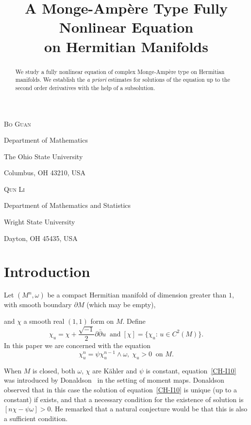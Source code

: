 \documentclass[12pt]{amsart}
\title[Complex Monge-Amp\`ere Type Equation]
{A Monge-Amp\`ere Type Fully Nonlinear Equation \\ on Hermitian Manifolds}
\author[Bo Guan and Qun Li]{}
\theoremstyle{definition}
\numberwithin{equation}{section}
\begin{document}
\maketitle

\centerline{\scshape Bo Guan }
\medskip
{\footnotesize
 \centerline{Department of Mathematics}
   \centerline{The Ohio State University}
   \centerline{Columbus, OH 43210, USA}
} 

\medskip

\centerline{\scshape Qun Li}
\medskip
{\footnotesize
 
 \centerline{Department of Mathematics and Statistics}
   \centerline{Wright State University}
   \centerline{Dayton, OH 45435, USA}
}

\begin{abstract}
We study a fully nonlinear equation of complex Monge-Amp\`ere type on
Hermitian manifolds. We establish the {\em a priori} estimates for
solutions of the equation up to the second order derivatives with the help
of a subsolution.

\end{abstract}

\bigskip

\section{Introduction}
\label{gblq-I}
\setcounter{equation}{0}
\medskip

Let $(M^n, \omega)$ be a compact Hermitian manifold of
dimension greater than  $1$, with smooth boundary $\partial M$ (which may be
empty),
 
and $\chi$ a smooth real $(1,1)$ form on $M$. Define
\[ \chi_u = \chi + \frac{\sqrt{-1}}{2} \partial {\bar{\partial}} u
\;\; \mbox{and} \; [\chi] = \big\{\chi_u:  \, u \in C^2 (M)\big\}. \]
In this paper we are concerned with the equation
 \begin{equation}
\label{CH-I10}
 \chi_u^n =  \psi \chi_u^{n-1} \wedge \omega, \; \chi_u > 0
\;\; \mbox{on $M$}.
\end{equation}

When  $M$ is closed, both $\omega$, $\chi$ are K\"ahler and
$\psi$ is constant,
equation~\eqref{CH-I10} was introduced by Donaldson~\cite{Donaldson99a}
in the setting of moment maps.
Donaldson observed that in this case the solution of
equation~\eqref{CH-I10} is unique (up to a constant) if exists, and that a
necessary condition for the existence of solution is
$[n \chi - \psi \omega] > 0$.
He remarked that a natural conjecture would be that this is also a
sufficient condition.
\end{document}

